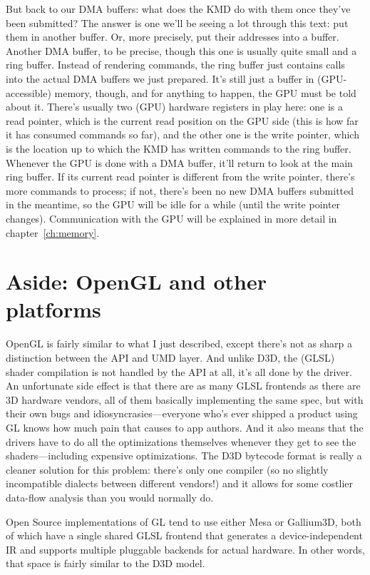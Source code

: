But back to our DMA buffers: what does the KMD do with them once they've been 
submitted? The answer is one we'll be seeing a lot through this text: put them 
in another buffer. Or, more precisely, put their addresses into a buffer.  
Another DMA buffer, to be precise, though this one is usually quite small and 
a ring buffer. Instead of rendering commands, the ring buffer just contains 
calls into the actual DMA buffers we just prepared. It's still just a buffer in 
(GPU-accessible) memory, though, and for anything to happen, the GPU must be 
told about it. There's usually two (GPU) hardware registers in play here: one 
is a read pointer, which is the current read position on the GPU side (this is 
how far it has consumed commands so far), and the other one is the write 
pointer, which is the location up to which the KMD has written commands to the 
ring buffer. Whenever the GPU is done with a DMA buffer, it'll return to look 
at the main ring buffer. If its current read pointer is different from the 
write pointer, there's more commands to process; if not, there's been no new 
DMA buffers submitted in the meantime, so the GPU will be idle for a while 
(until the write pointer changes). Communication with the GPU will be explained 
in more detail in chapter~\ref{ch:memory}.

\section{Aside: OpenGL and other platforms}

OpenGL is fairly similar to what I just described, except there's not as sharp
a distinction between the API and UMD layer. And unlike D3D, the (GLSL) shader
compilation is not handled by the API at all, it's all done by the driver. An
unfortunate side effect is that there are as many GLSL frontends as there are
3D hardware vendors, all of them basically implementing the same spec, but with
their own bugs and idiosyncrasies---everyone who's ever shipped a product using 
GL knows how much pain that causes to app authors. And it also means that the 
drivers
have to do all the optimizations themselves whenever they get to see the
shaders---including expensive optimizations. The D3D bytecode format is really
a cleaner solution for this problem: there's only one compiler (so no slightly
incompatible dialects between different vendors!) and it allows for some
costlier data-flow analysis than you would normally do.

Open Source implementations of GL tend to use either Mesa or Gallium3D, both of
which have a single shared GLSL frontend that generates a device-independent IR
and supports multiple pluggable backends for actual hardware. In other words,
that space is fairly similar to the D3D model.


